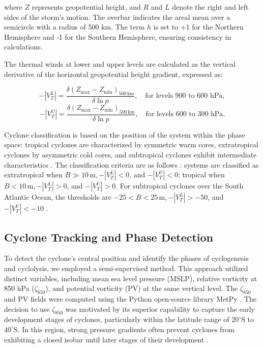 \documentclass[pdflatex,sn-chicago]{sn-jnl}%
\theoremstyle{plain}
\theoremstyle{definition}
\theoremstyle{remark}
\theoremstyle{definition}
\begin{document}
where \(Z\) represents geopotential height, and \(R\) and \(L\) denote the right and left sides of the storm’s motion. The overbar indicates the areal mean over a semicircle with a radius of 500 km. The term \(h\) is set to +1 for the Northern Hemisphere and -1 for the Southern Hemisphere, ensuring consistency in calculations.

The thermal winds at lower and upper levels are calculated as the vertical derivative of the horizontal geopotential height gradient, expressed as:

\begin{equation}
-|V_T^L| = \frac{\delta \left( Z_{\text{max}} - Z_{\text{min}} \right)_{500\, \text{km}}}{\delta \ln p}, \quad \text{for levels 900 to 600 hPa},
\end{equation}
\begin{equation}
-|V_T^U| = \frac{\delta \left( Z_{\text{max}} - Z_{\text{min}} \right)_{500\, \text{km}}}{\delta \ln p}, \quad \text{for levels 600 to 300 hPa}.
\end{equation}

Cyclone classification is based on the position of the system within the phase space: tropical cyclones are characterized by symmetric warm cores, extratropical cyclones by asymmetric cold cores, and subtropical cyclones exhibit intermediate characteristics \citep{hart2003cyclone}. The classification criteria are as follows \citep{wood2023phase}: systems are classified as extratropical when \(B \gg 10\, \text{m}, -|V_T^L| < 0\), and \(-|V_T^U| < 0\); tropical when \(B < 10\, \text{m}, -|V_T^L| > 0\), and \(-|V_T^U| > 0\). For subtropical cyclones over the South Atlantic Ocean, the thresholds are \(-25 < B < 25\, \text{m}, -|V_T^L| > -50\), and \(-|V_T^U| < -10\) \citep{gozzo2014subtropical,gozzo2017climatology,de2022future,cardoso2022synoptic}.



\subsection{Cyclone Tracking and Phase Detection}

To detect the cyclone's central position and identify the phases of cyclogenesis and cyclolysis, we employed a semi-supervised method. This approach utilized distinct variables, including mean sea level pressure (MSLP), relative vorticity at 850 hPa ($\zeta_{850}$), and potential vorticity (PV) at the same vertical level. The $\zeta_{850}$ and PV fields were computed using the Python open-source library MetPy \citep{may2022metpy}. The decision to use $\zeta_{850}$ was motivated by its superior capability to capture the early development stages of cyclones, particularly within the latitude range of $20^{\circ}\text{S}$ to $40^{\circ}\text{S}$. In this region, strong pressure gradients often prevent cyclones from exhibiting a closed isobar until later stages of their development \citep{sinclair1994objective,hoskins2002new,gramcianinov2019properties}.
\end{document}
